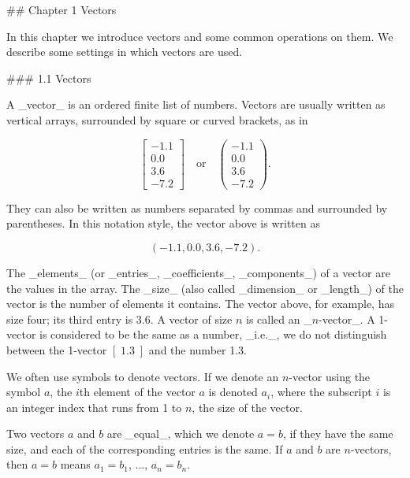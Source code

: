

## Chapter 1 Vectors

In this chapter we introduce vectors and some common operations on them. We describe some settings in which vectors are used.

### 1.1 Vectors

A _vector_ is an ordered finite list of numbers. Vectors are usually written as vertical arrays, surrounded by square or curved brackets, as in

\[\left[\begin{array}{c}-1.1\\ 0.0\\ 3.6\\ -7.2\end{array}\right]\quad\mbox{or}\quad\left(\begin{array}{c}-1.1\\ 0.0\\ 3.6\\ -7.2\end{array}\right).\]

They can also be written as numbers separated by commas and surrounded by parentheses. In this notation style, the vector above is written as

\[(-1.1,0.0,3.6,-7.2).\]

The _elements_ (or _entries_, _coefficients_, _components_) of a vector are the values in the array. The _size_ (also called _dimension_ or _length_) of the vector is the number of elements it contains. The vector above, for example, has size four; its third entry is 3.6. A vector of size \(n\) is called an _\(n\)-vector_. A 1-vector is considered to be the same as a number, _i.e._, we do not distinguish between the 1-vector \([\;1.3\;]\) and the number 1.3.

We often use symbols to denote vectors. If we denote an \(n\)-vector using the symbol \(a\), the \(i\)th element of the vector \(a\) is denoted \(a_{i}\), where the subscript \(i\) is an integer index that runs from 1 to \(n\), the size of the vector.

Two vectors \(a\) and \(b\) are _equal_, which we denote \(a=b\), if they have the same size, and each of the corresponding entries is the same. If \(a\) and \(b\) are \(n\)-vectors, then \(a=b\) means \(a_{1}=b_{1}\), ..., \(a_{n}=b_{n}\).

